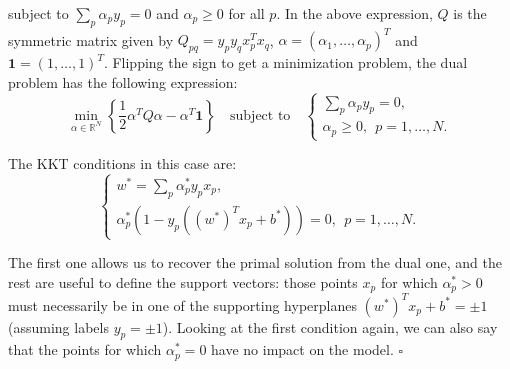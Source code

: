 \documentclass[12pt]{article}
\newcommand*{\QED}{\null\nobreak\hfill\ensuremath{\square}}%
\begin{document}
subject to $\sum_p \alpha_p y_p=0$ and $\alpha_p\geq 0$ for all $p$. In the above expression, $Q$ is the symmetric matrix given by $Q_{pq}=y_py_qx_p^Tx_q$, $\alpha=(\alpha_1,\dots,\alpha_p)^T$ and $\mathbf{1}=(1,\dots,1)^T$. Flipping the sign to get a minimization problem, the dual problem has the following expression:
\[
\min_{\alpha\in\mathbb R^N} \left\{\frac{1}{2}\alpha^T Q \alpha - \alpha^T \mathbf{1}\right\} \quad \text{subject to} \quad \begin{cases}
\displaystyle \sum_p \alpha_p y_p=0,\\
  \alpha_p \geq 0, \ \ p=1,\dots, N.
\end{cases}
\]

The KKT conditions in this case are:
\[
\begin{cases}
\displaystyle  w^* = \sum_{p}\alpha^*_p y_p x_p,\\
\alpha_p^*(1 - y_p((w^*)^Tx_p + b^*)) =0, \ \ p=1,\dots,N.
\end{cases}
\]

The first one allows us to recover the primal solution from the dual one, and the rest are useful to define the support vectors: those points $x_p$ for which $\alpha^*_p>0$ must necessarily be in one of the supporting hyperplanes $(w^*)^Tx_p + b^*=\pm 1$ (assuming labels $y_p=\pm 1$). Looking at the first condition again, we can also say that the points for which $\alpha^*_p=0$ have no impact on the model.
\QED
\end{document}
